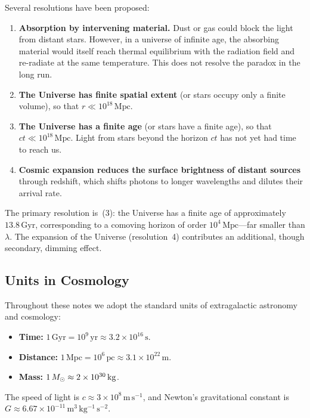 Several resolutions have been proposed:
\begin{enumerate}
    \item \textbf{Absorption by intervening material.} Dust or gas could block the light from distant stars. However, in a universe of infinite age, the absorbing material would itself reach thermal equilibrium with the radiation field and re-radiate at the same temperature. This does not resolve the paradox in the long run.
    \item \textbf{The Universe has finite spatial extent} (or stars occupy only a finite volume), so that $r \ll 10^{18}\,\mathrm{Mpc}$.
    \item \textbf{The Universe has a finite age} (or stars have a finite age), so that $ct \ll 10^{18}\,\mathrm{Mpc}$. Light from stars beyond the horizon $ct$ has not yet had time to reach us.
    \item \textbf{Cosmic expansion reduces the surface brightness of distant sources} through redshift, which shifts photons to longer wavelengths and dilutes their arrival rate.
\end{enumerate}
The primary resolution is~(3): the Universe has a finite age of approximately $13.8\,\mathrm{Gyr}$, corresponding to a comoving horizon of order $10^{4}\,\mathrm{Mpc}$---far smaller than $\lambda$. The expansion of the Universe (resolution~4) contributes an additional, though secondary, dimming effect.

\subsection{Units in Cosmology}

Throughout these notes we adopt the standard units of extragalactic astronomy and cosmology:
\begin{itemize}
    \item \textbf{Time:} $1\,\mathrm{Gyr} = 10^{9}\,\mathrm{yr} \approx 3.2\times 10^{16}\,\mathrm{s}$.
    \item \textbf{Distance:} $1\,\mathrm{Mpc} = 10^{6}\,\mathrm{pc} \approx 3.1\times 10^{22}\,\mathrm{m}$.
    \item \textbf{Mass:} $1\,M_{\odot} \approx 2\times 10^{30}\,\mathrm{kg}$.
\end{itemize}
The speed of light is $c\approx 3\times 10^{8}\,\mathrm{m\,s^{-1}}$, and Newton's gravitational constant is $G\approx 6.67\times 10^{-11}\,\mathrm{m^3\,kg^{-1}\,s^{-2}}$.



